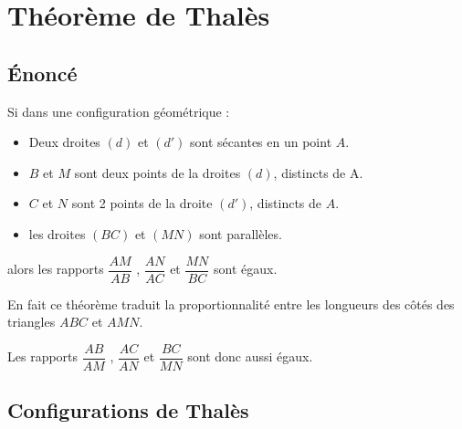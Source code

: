 \section{Théorème de Thalès}
    \subsection{Énoncé}
        \begin{theoreme}[\admis]
            Si dans une configuration géométrique :
            \begin{itemize}
                \item Deux droites $(d)$ et $(d')$ sont sécantes en un point $A$.
                \item $B$ et $M$ sont deux points de la droites $(d)$, distincts de A.
                \item $C$ et $N$ sont 2 points de la droite $(d')$, distincts de $A$.
                \item les droites $(BC)$ et $(MN)$ sont parallèles.       
            \end{itemize}
            \medskip
            alors les rapports $\dfrac{AM}{AB}$ , $\dfrac{AN}{AC}$ et $\dfrac{MN}{BC}$ sont égaux.
        \end{theoreme}

        \begin{remarque}
            En fait ce théorème traduit la proportionnalité entre les longueurs des côtés des triangles $ABC$ et $AMN$.

            Les rapports $\dfrac{AB}{AM}$ , $\dfrac{AC}{AN}$ et $\dfrac{BC}{MN}$ sont donc aussi égaux.
        \end{remarque}
    
    \subsection{Configurations de Thalès}
         \color{red}{\dashuline{\color{black}{Les droites en pointillés rouges sont parallèles.}}}
        \color{black}

